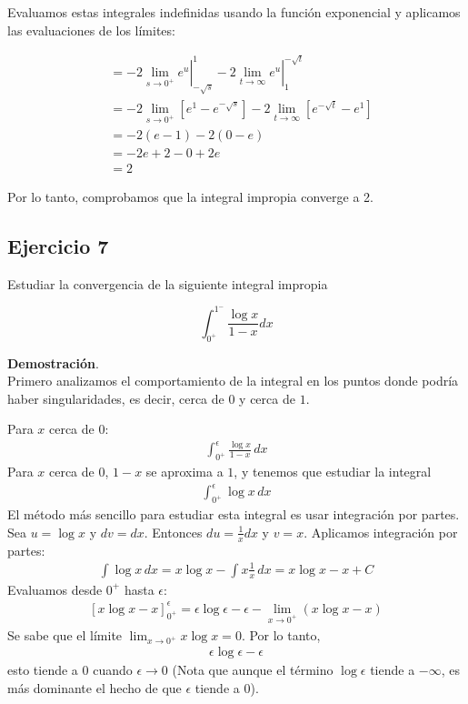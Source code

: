\documentclass{article}
\begin{document}
    Evaluamos estas integrales indefinidas usando la función exponencial y aplicamos las evaluaciones de los límites:

    \begin{align*}
    & = -\left.2 \lim_{s \rightarrow 0^{+}} e^{u} \right|_{-\sqrt{s}}^{1} - \left.2 \lim_{t \rightarrow \infty} e^{u} \right|_{1}^{-\sqrt{t}} \\
    & = -2 \lim_{s \rightarrow 0^{+}} \left[e^{1} - e^{-\sqrt{s}}\right] - 2 \lim_{t \rightarrow \infty} \left[e^{-\sqrt{t}} - e^{1}\right] \\
    & = -2(e - 1) - 2(0 - e) \\
    & = -2e + 2 - 0 + 2e \\
    & = 2
    \end{align*}

    Por lo tanto, comprobamos que la integral impropia converge a 2.

    \subsection*{Ejercicio 7}

    Estudiar la convergencia de la siguiente integral impropia

    $$
    \int_{0^{+}}^{1^{-}} \frac{\log x}{1-x} d x
    $$

    \textbf{Demostración}.\\

    Primero analizamos el comportamiento de la integral en los puntos donde podría haber singularidades, es decir, cerca de $0$ y cerca de $1$.

    Para $x$ cerca de $0$:
    \begin{align*}
    \int_{0^+}^\epsilon \frac{\log x}{1-x} \, dx
    \end{align*}
    Para $x$ cerca de $0$, $1-x$ se aproxima a $1$, y tenemos que estudiar la integral
    \begin{align*}
    \int_{0^+}^\epsilon \log x \, dx
    \end{align*}
    El método más sencillo para estudiar esta integral es usar integración por partes. Sea $u = \log x$ y $dv = dx$. Entonces $du = \frac{1}{x} dx$ y $v = x$. Aplicamos integración por partes:
    \begin{align*}
    \int \log x \, dx = x \log x - \int x \frac{1}{x} \, dx = x \log x - x + C
    \end{align*}
    Evaluamos desde $0^+$ hasta $\epsilon$:
    \begin{align*}
    \left[ x \log x - x \right]_{0^+}^\epsilon = \epsilon \log \epsilon - \epsilon - \lim_{x \to 0^+}(x \log x - x)
    \end{align*}
    Se sabe que el límite $\lim_{x \to 0^+} x \log x = 0$. Por lo tanto,
    \begin{align*}
    \epsilon \log \epsilon - \epsilon
    \end{align*}
    esto tiende a $0$ cuando $\epsilon \to 0$ (Nota que aunque el término $ \log \epsilon$ tiende a $-\infty$, es más dominante el hecho de que $\epsilon$ tiende a $0$).
\end{document}

